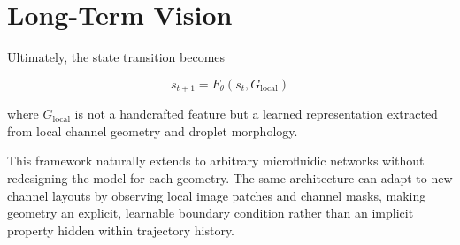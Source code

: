 \documentclass[11pt]{article}
\begin{document}
\section{Long-Term Vision}

Ultimately, the state transition becomes

\[
s_{t+1}=F_\theta(s_t,G_{\mathrm{local}})
\]

where $G_{\mathrm{local}}$ is not a handcrafted feature but a learned representation extracted from local channel geometry and droplet morphology.

This framework naturally extends to arbitrary microfluidic networks without redesigning the model for each geometry. The same architecture can adapt to new channel layouts by observing local image patches and channel masks, making geometry an explicit, learnable boundary condition rather than an implicit property hidden within trajectory history.
\end{document}

